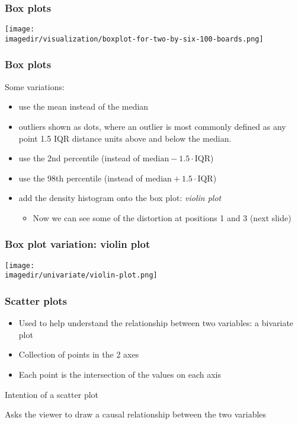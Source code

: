 \begin{frame}\frametitle{Box plots}
	\begin{center}
		\texttt{[image: \\imagedir/visualization/boxplot-for-two-by-six-100-boards.png]}
	\end{center}
\end{frame}

\begin{frame}\frametitle{Box plots}
	
	Some variations:
	\begin{itemize}
		\item	use the mean instead of the median 
		\item	outliers shown as dots, where an outlier is most commonly defined as any point 1.5 IQR distance units above and below the median. 
		\item	use the 2nd percentile (instead of $\text{median} - 1.5\cdot\text{IQR}$) 
		\item	use the 98th percentile (instead of $\text{median} + 1.5\cdot\text{IQR}$) 
		\item	add the density histogram onto the box plot: \emph{violin plot} 
		\begin{itemize}
			\item	Now we can see some of the distortion at positions 1 and 3 (next slide)
		\end{itemize}
	\end{itemize}
\end{frame}

\begin{frame}\frametitle{Box plot variation: violin plot}
	\begin{center}
		\texttt{[image: \\imagedir/univariate/violin-plot.png]}
	\end{center}
\end{frame}

\begin{frame}\frametitle{Scatter plots}
	\begin{itemize}
		\item	Used to help understand the relationship between two variables: a bivariate plot 
		\item	Collection of points in the 2 axes 
		\item	Each point is the intersection of the values on each axis 
	\end{itemize}
	\begin{block}
		{Intention of a scatter plot} 
		\begin{center}
			Asks the viewer to draw a causal relationship between the two variables 
		\end{center}
	\end{block}
\end{frame}

